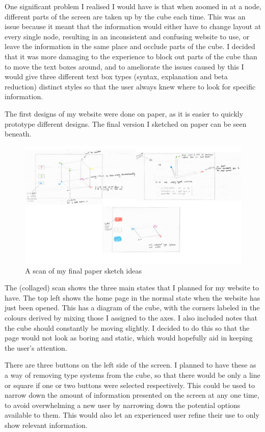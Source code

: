 \documentclass{l4proj}
\begin{document}
One significant problem I realised I would have is that when zoomed in at a node, different parts of the screen are taken up by the cube each time.  This was an issue because it meant that the information would either have to change layout at every single node, resulting in an inconsistent and confusing website to use, or leave the information in the same place and occlude parts of the cube.  I decided that it was more damaging to the experience to block out parts of the cube than to move the text boxes around, and to ameliorate the issues caused by this I would give three different text box types (syntax, explanation and beta reduction) distinct styles so that the user always knew where to look for specific information.

The first designs of my website were done on paper, as it is easier to quickly prototype different designs.  The final version I sketched on paper can be seen beneath.

\begin{figure}[h!]
    \centering
    \includegraphics[width=1\linewidth]{dissertation/images/paper_collaged_taller.png}
    \caption{A scan of my final paper sketch ideas}
    \label{fig:enter-label}
\end{figure}

The (collaged) scan shows the three main states that I planned for my website to have.  The top left shows the home page in the normal state when the website has just been opened.  This has a diagram of the cube, with the corners labeled in the colours derived by mixing those I assigned to the axes.  I also included notes that the cube should constantly be moving slightly.  I decided to do this so that the page would not look as boring and static, which would hopefully aid in keeping the user's attention.  

There are three buttons on the left side of the screen.  I planned to have these as a way of removing type systems from the cube, so that there would be only a line or square if one or two buttons were selected respectively.  This could be used to narrow down the amount of information presented on the screen at any one time, to avoid overwhelming a new user by narrowing down the potential options available to them.  This would also let an experienced user refine their use to only show relevant information.
\end{document}

